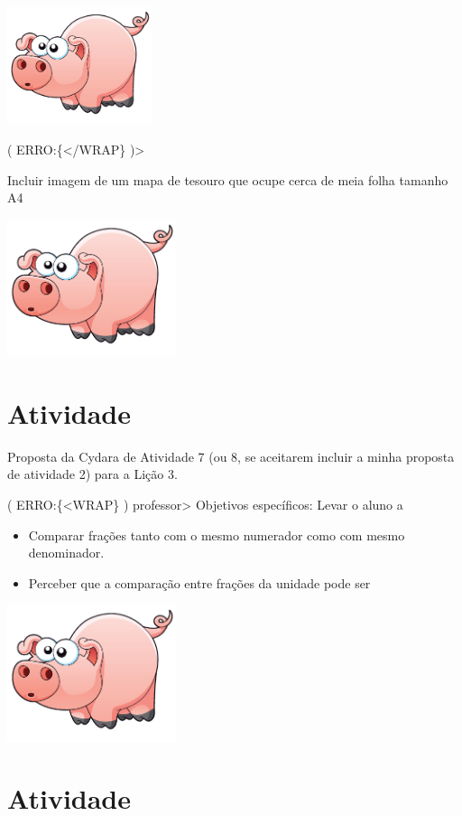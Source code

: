 \documentclass[a4,12pt]{book}
\newcounter{atividade}
\begin{document}
\includegraphics[width=120pt, keepaspectratio]{pig}

( ERRO:\{</WRAP\} )>


Incluir imagem de um mapa de tesouro que ocupe cerca de meia folha tamanho A4


\includegraphics[width=\textwidth,height=4cm, keepaspectratio]{pig}
\section{Atividade}

Proposta da Cydara de Atividade 7 (ou 8, se aceitarem incluir a minha proposta de atividade 2)  para a Lição 3.




( ERRO:\{<WRAP\} ) professor>
Objetivos específicos: Levar o aluno a
\begin{itemize} %
  \item     Comparar frações tanto com o mesmo numerador como com mesmo denominador.
  \item     Perceber que a comparação entre frações da unidade pode ser
\end{itemize} %



\includegraphics[width=\textwidth,height=4cm, keepaspectratio]{pig}
\section{Atividade}
\end{document}
